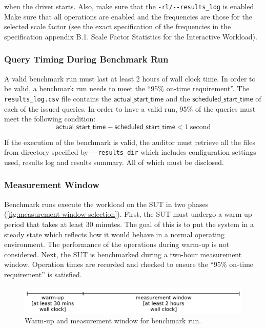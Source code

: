 \begin{description}
    when the driver starts. Also, make sure that the \verb|-rl/--results_log| is enabled. Make sure that all operations are enabled and the frequencies are those for the selected scale factor (see the exact specification of the frequencies in the specification appendix B.1. Scale Factor Statistics for the Interactive Workload).
\end{description}

\subsubsection{Query Timing During Benchmark Run}
\label{sec:ontime-requirements}
A valid benchmark run must last at least 2 hours of wall clock time.
In order to be valid, a benchmark run needs to meet the ``95\% on-time requirement''.
The \texttt{results\_log.csv} file contains the $\mathsf{actual\_start\_time}$ and the $\mathsf{scheduled\_start\_time}$ of each of the issued queries. In order to have a valid run, 95\% of the queries must meet the following condition:
\begin{equation*}
\mathsf{actual\_start\_time} - \mathsf{scheduled\_start\_time} < 1\
\mathrm{second}
\end{equation*}

If the execution of the benchmark is valid, the auditor must retrieve all the files from directory specified by \verb|--results_dir| which includes configuration settings used, results log and results summary. All of which must be disclosed.

\subsubsection{Measurement Window}

Benchmark runs execute the workload on the SUT in two phases (\autoref{fig:measurement-window-selection}).
First, the SUT must undergo a warm-up period that takes at least 30 minutes. The goal of this is to put the system in a steady state which reflects how it would behave in a normal operating environment. The performance of the operations during warm-up is not considered.
Next, the SUT is benchmarked during a two-hour measurement window. Operation times are recorded and checked to ensure the ``95\% on-time requirement'' is satisfied.

\begin{figure}[h]
    \centering
    \includegraphics[width=.7\linewidth]{figures/measurement-window-selection}
    \caption{Warm-up and measurement window for benchmark run.}
    \label{fig:measurement-window-selection}
\end{figure}


